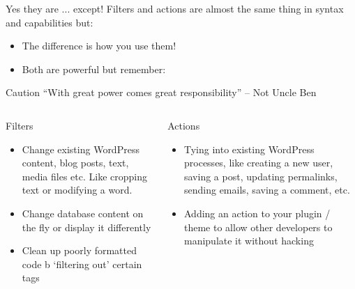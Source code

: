 \documentclass[10pt]{beamer}
\begin{document}
    \begin{frame}{Yes they are ... except!}
        Filters and actions are almost the same thing in syntax and capabilities but:
        \begin{itemize}
            \item The difference is how you use them!
            \item Both are powerful but remember:
        \end{itemize}
        \begin{alertblock}{Caution}
            ``With great power comes great responsibility'' -- Not Uncle Ben
        \end{alertblock}
    \end{frame}

    \begin{frame}
        \begin{columns}
            \begin{column}{0.5\textwidth}
                \begin{center}
                    \begin{Huge}
                        Filters
                    \end{Huge}
                \end{center}
                \begin{itemize}
                    \item Change existing WordPress content, blog posts, text, media files etc. Like cropping text or modifying a word.
                    \item Change database content on the fly or display it differently
                    \item Clean up poorly formatted code b ‘filtering out’ certain tags
                \end{itemize}
            \end{column}
            \begin{column}{0.5\textwidth}
                \begin{center}
                    \begin{Huge}
                        Actions
                    \end{Huge}
                \end{center}
                \begin{itemize}
                    \item Tying into existing WordPress processes, like creating a new user, saving a post, updating permalinks, sending emails, saving a comment, etc. 
                    \item Adding an action to your plugin / theme to allow other developers to manipulate it without hacking 
                \end{itemize}
            \end{column}
        \end{columns}
    \end{frame}
\end{document}
